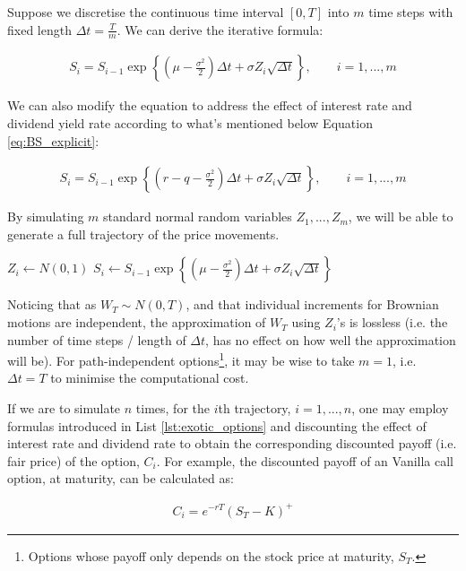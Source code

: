 Suppose we discretise the continuous time interval $[0,T]$ into $m$ time steps with fixed length $\Delta t=\frac{T}{m}$. We can derive the iterative formula:

\begin{align} \label{eq:mc_explicit}
S_{i} = S_{i-1}\exp{\left\{(\mu-\frac{\sigma^2}{2})\Delta t+\sigma Z_i \sqrt{\Delta t}\right\}},\qquad i=1,...,m
\end{align}

We can also modify the equation to address the effect of interest rate and dividend yield rate according to what's mentioned below Equation \ref{eq:BS_explicit}:

\begin{align} \label{eq:mc_explicit_rq}
S_{i} = S_{i-1}\exp{\left\{(r-q-\frac{\sigma^2}{2})\Delta t+\sigma Z_i \sqrt{\Delta t}\right\}},\qquad i=1,...,m
\end{align}

By simulating $m$ standard normal random variables $Z_1,...,Z_m$, we will be able to generate a full trajectory of the price movements.

\begin{algorithmic}
	\State $Z_{i} \gets N(0,1)$
	\State $S_{i} \gets S_{i-1}\exp{\left\{(\mu-\frac{\sigma^2}{2})\Delta t+\sigma Z_i \sqrt{\Delta t}\right\}}$
\EndFor
\end{algorithmic}

Noticing that as $W_T\sim N(0,T)$, and that individual increments for Brownian motions are independent, the approximation of $W_T$ using $Z_i$'s is lossless (i.e. the number of time steps / length of $\Delta t$, has no effect on how well the approximation will be). For path-independent options\footnote{Options whose payoff only depends on the stock price at maturity, $S_T$.}, it may be wise to take $m=1$, i.e. $\Delta t=T$ to minimise the computational cost.

If we are to simulate $n$ times, for the $i$th trajectory, $i=1,...,n$, one may employ formulas introduced in List \ref{lst:exotic_options} and discounting the effect of interest rate and dividend rate to obtain the corresponding discounted payoff (i.e. fair price) of the option, $C_i$. For example, the discounted payoff of an Vanilla call option, at maturity, can be calculated as:

\begin{align} \label{eq:discount_vanilla_payoff}
C_i = e^{-rT}(S_T-K)^+
\end{align}

